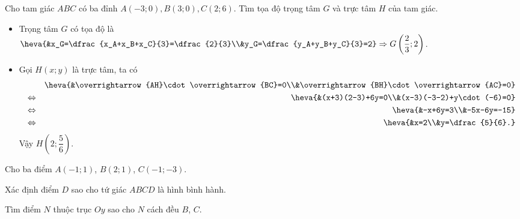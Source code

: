\begin{bt}%
	Cho tam giác $ABC$ có ba đỉnh $A(-3;0), B(3;0), C(2;6)$. Tìm tọa độ trọng tâm $G$ và trực tâm $H$ của tam giác.
	\loigiai
	{
		\begin{itemize}
			\item Trọng tâm $G$ có tọa độ là $\heva{&x_G=\dfrac{x_A+x_B+x_C}{3}=\dfrac{2}{3}\\&y_G=\dfrac{y_A+y_B+y_C}{3}=2}\Rightarrow G\left(\dfrac{2}{3};2\right)$.
			\item Gọi $H(x;y)$ là trực tâm, ta có
			\begin{eqnarray*}
				\allowdisplaybreaks 
				&&\heva{&\overrightarrow{AH}\cdot\overrightarrow{BC}=0\\&\overrightarrow{BH}\cdot\overrightarrow{AC}=0}\\
				&\Leftrightarrow& \heva{&(x+3)(2-3)+6y=0\\&(x-3)(-3-2)+y\cdot (-6)=0}\\
				&\Leftrightarrow&\heva{&-x+6y=3\\&-5x-6y=-15}\\
				&\Leftrightarrow& \heva{&x=2\\&y=\dfrac{5}{6}.}
			\end{eqnarray*}
			Vậy $H\left(2;\dfrac{5}{6}\right)$.
		\end{itemize}
	}
\end{bt}

\begin{bt}%
	Cho ba điểm $A(-1;1)$, $B(2;1)$, $C(-1;-3)$.
	\begin{listEX}[1]
	\item Xác định điểm $D$ sao cho tứ giác $ABCD$ là hình bình hành.
	\item Tìm điểm $N$ thuộc trục $Oy$ sao cho $N$ cách đều $B$, $C$.
	\end{listEX}
\end{bt}


